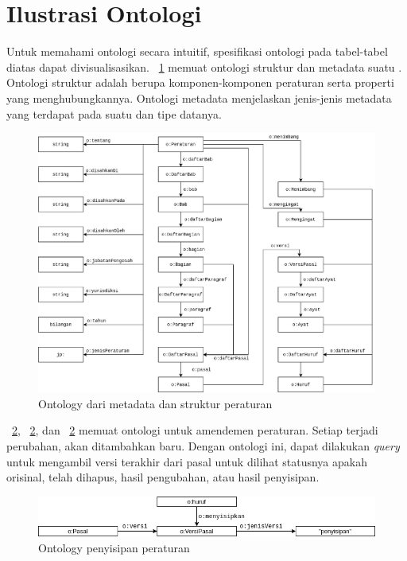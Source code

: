 \section{Ilustrasi Ontologi}
\label{sec:ilustrasi-ontologi}

Untuk memahami ontologi secara intuitif, spesifikasi ontologi pada tabel-tabel diatas dapat
divisualisasikan. \pic~\ref{fig:ontologi-struktur} memuat ontologi struktur dan metadata suatu
\legal. Ontologi struktur adalah berupa komponen-komponen peraturan serta properti yang
menghubungkannya. Ontologi metadata menjelaskan jenis-jenis metadata yang terdapat pada suatu \legal
dan tipe datanya.

\begin{figure}[H]
  \centering
  \includegraphics[width=\textwidth]{pictures/ontologi-stuktur.png}
  \caption{Ontology dari metadata dan struktur peraturan}
  \label{fig:ontologi-struktur}
\end{figure}

\pic~\ref{fig:insert}, \pic~\ref{fig:insert}, dan \pic~\ref{fig:insert} memuat ontologi untuk
amendemen peraturan. Setiap terjadi perubahan, akan ditambahkan  baru. Dengan
ontologi ini, dapat dilakukan \textit{query} untuk mengambil versi terakhir dari pasal untuk dilihat
statusnya apakah orisinal, telah dihapus, hasil pengubahan, atau hasil penyisipan.

\begin{figure}[H]
  \centering
  \includegraphics[width=\textwidth]{pictures/insert.png}
  \caption{Ontology penyisipan peraturan}
  \label{fig:insert}
\end{figure}

